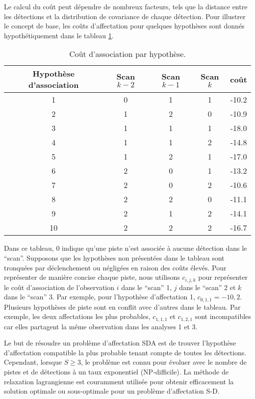 \documentclass[10pt,french,a4paper]{report}
\begin{document}
Le calcul du coût peut dépendre de nombreux facteurs, tels que la distance entre les détections et la distribution de covariance de chaque détection. Pour illustrer le concept de base, les coûts d'affectation pour quelques hypothèses sont donnés hypothétiquement dans le tableau \ref{table:cost}.
\begin{center}
\begin{table}
\begin{tabular}{|c|c|c|c|c|}
\hline 
Hypothèse d'association & Scan $k-2$ & Scan $k-1$ & Scan $k$ & coût \\ 
\hline 
1 & 0 & 1 & 1 & -10.2 \\ 
\hline 
2 & 1 & 2 & 0 & -10.9 \\ 
\hline 
3 & 1 & 1 & 1 & -18.0 \\ 
\hline 
4 & 1 & 1 & 2 & -14.8 \\ 
\hline 
5 & 1 & 2 & 1 & -17.0 \\ 
\hline 
6 & 2 & 0 & 1 & -13.2 \\ 
\hline 
7 & 2 & 0 & 2 & -10.6 \\ 
\hline 
8 & 2 & 2 & 0 & -11.1 \\ 
\hline 
9 & 2 & 1 & 2 & -14.1 \\ 
\hline 
10 & 2 & 2 & 2 & -16.7\\
\hline   
\end{tabular} 
\caption{Coût d'association par hypothèse.}
\label{table:cost}
\end{table}
\end{center}
Dans ce tableau, 0 indique qu'une piste n'est associée à aucune détection dans le ``scan''. Supposons que les hypothèses non présentées dans le tableau sont tronquées par déclenchement ou négligées en raison des coûts élevés. Pour représenter de manière concise chaque piste, nous utilisons $c_{i,j,k}$ pour représenter le coût d'association de l'observation $i$ dans le ``scan'' 1, $j$ dans le ``scan'' 2 et $k$ dans le ``scan'' 3. Par exemple, pour l'hypothèse d'affectation 1, $c_{0,1,1}  = -10,2$. Plusieurs hypothèses de piste sont en conflit avec d'autres dans le tableau. Par exemple, les deux affectations les plus probables, $c_{1,1,1}$ et $c_{1,2,1}$ sont incompatibles car elles partagent la même observation dans les analyses 1 et 3.

Le but de résoudre un problème d'affectation \ac{SDA} est de trouver l'hypothèse d'affectation compatible la plus probable tenant compte de toutes les détections. Cependant, lorsque $S \geq 3$, le problème est connu pour évoluer avec le nombre de pistes et de détections à un taux exponentiel (NP-difficile). La méthode de relaxation lagrangienne est couramment utilisée pour obtenir efficacement la solution optimale ou sous-optimale pour un problème d'affectation S-D.
\end{document}
